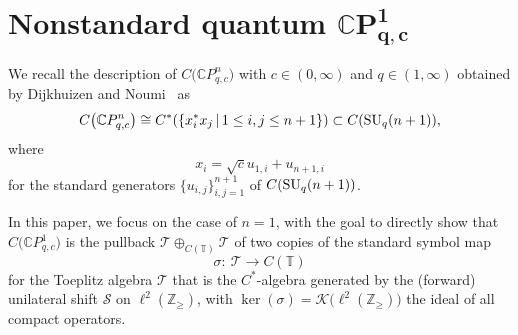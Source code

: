 \documentclass[pdftex]{sigma}
\begin{document}
\section[Nonstandard quantum $\mathbb{C}P_{q,c}^{1}$]{Nonstandard quantum $\boldsymbol{\mathbb{C}P_{q,c}^{1}}$}

We recall the description of $C\big( \mathbb{C}P_{q,c}^{n}\big) $ with
$c\in ( 0,\infty ) $ and $q\in ( 1,\infty ) $ obtained
by Dijkhuizen and Noumi~\cite{DiNo} as
\[
C\big(\mathbb{C}P_{q,c}^{n}\big)\cong C^{\ast}(\{x_{i}^{\ast}x_{j}\,|\,1\leq i,j\leq
n+1\})\subset C ( {\rm SU}_{q}(n+1) ),
\]
where
\[
x_{i}=\sqrt{c}u_{1,i}+u_{n+1,i}
\]
for the standard generators $\{ u_{i,j}\} _{i,j=1}^{n+1}$ of $C( {\rm SU}_{q}(n+1))$.

In this paper, we focus on the case of $n=1$, with the goal to directly show
that $C\big( \mathbb{C}P_{q,c}^{1}\big) $ is the pullback $\mathcal{T}\oplus_{C( \mathbb{T}) }\mathcal{T}$ of two copies of the
standard symbol map
\[
\sigma\colon \ \mathcal{T}\rightarrow C ( \mathbb{T} )
\]
for the Toeplitz algebra $\mathcal{T}$ that is the $C^*$-algebra generated by the
(forward) unilateral shift $\mathcal{S}$ on $\ell^{2}( \mathbb{Z}_{\geq
}) $, with $\ker( \sigma) =\mathcal{K}\big( \ell
^{2} ( \mathbb{Z}_{\geq} )\big) $ the ideal of all compact operators.
\end{document}
